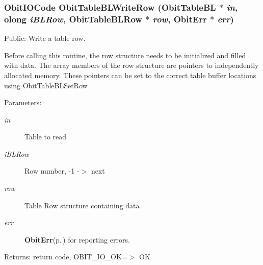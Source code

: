 \subsubsection{\setlength{\rightskip}{0pt plus 5cm}Obit\-IOCode Obit\-Table\-BLWrite\-Row ({\bf Obit\-Table\-BL} $\ast$ {\em in}, {\bf olong} {\em i\-BLRow}, {\bf Obit\-Table\-BLRow} $\ast$ {\em row}, {\bf Obit\-Err} $\ast$ {\em err})}\label{ObitTableBL_8c_a24}


Public: Write a table row. 

Before calling this routine, the row structure needs to be initialized and filled with data. The array members of the row structure are pointers to independently allocated memory. These pointers can be set to the correct table buffer locations using Obit\-Table\-BLSet\-Row \begin{Desc}
\item[Parameters:]
\begin{description}
\item[{\em in}]Table to read \item[{\em i\-BLRow}]Row number, -1 -$>$ next \item[{\em row}]Table Row structure containing data \item[{\em err}]{\bf Obit\-Err}{\rm (p.\,\pageref{structObitErr})} for reporting errors. \end{description}
\end{Desc}
\begin{Desc}
\item[Returns:]return code, OBIT\_\-IO\_\-OK=$>$ OK \end{Desc}

